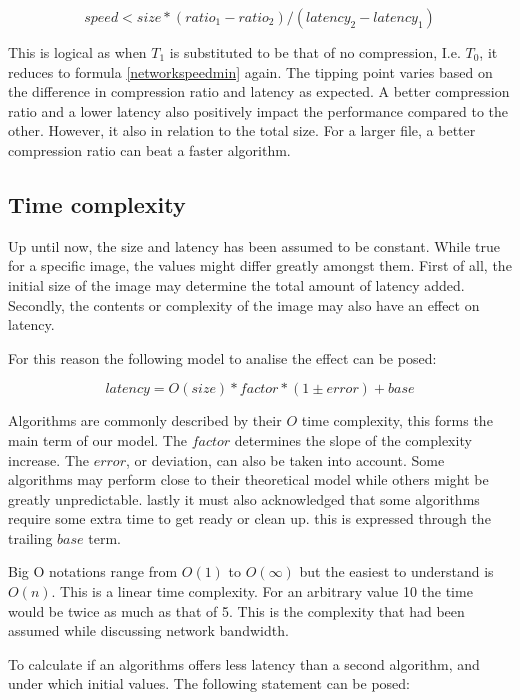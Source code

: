 \documentclass[11pt,a4paper]{report}
\begin{document}
\begin{equation}
speed < size * (ratio_1 - ratio_2) / (latency_2 - latency_1)
\end{equation}

This is logical as when $T_1$ is substituted to be that of no compression, I.e. $T_0$, it reduces to formula \ref{networkspeedmin} again. The tipping point varies based on the difference in compression ratio and latency as expected. A better compression ratio and a lower latency also positively impact the performance compared to the other. However, it also in relation to the total size. For a larger file, a better compression ratio can beat a faster algorithm. 

\subsection{Time complexity\label{complexitysection}}

Up until now, the size and latency has been assumed to be constant. While true for a specific image, the values might differ greatly amongst them. First of all, the initial size of the image may determine the total amount of latency added. Secondly, the contents or complexity of the image may also have an effect on latency.

For this reason the following model to analise the effect can be posed:

\begin{equation}
latency = O(size) * factor * (1 \pm error) + base
\label{complexityfun}
\end{equation}

Algorithms are commonly described by their $O$ time complexity, this forms the main term of our model. The $factor$ determines the slope of the complexity increase. The $error$, or deviation, can also be taken into account. Some algorithms may perform close to their theoretical model while others might be greatly unpredictable. lastly it must also acknowledged that some algorithms require some extra time to get ready or clean up. this is expressed through the trailing $base$ term.

Big O notations range from $O(1)$ to $O(\infty)$ but the easiest to understand is $O(n)$. This is a linear time complexity. For an arbitrary value 10 the time would be twice as much as that of 5. This is the complexity that had been assumed while discussing network bandwidth. 

To calculate if an algorithms offers less latency than a second algorithm, and under which initial values. The following statement can be posed:
\end{document}

